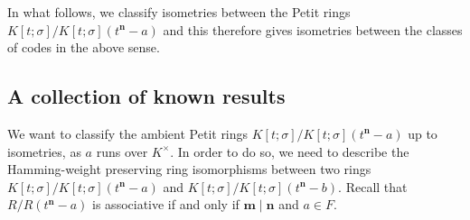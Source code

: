 \documentclass[11pt]{amsart}
\theoremstyle{plain}
\theoremstyle{definition}
\newtheorem{definition}[theorem]{Definition}
\numberwithin{equation}{section}
\numberwithin{figure}{section}
\newcommand{\Kone}[1]{K[t;\sigma]/K[t;\sigma](t^{\de}-#1)}
\newcommand{\os}{{\mathbf{m}}}  %
\newcommand{\de}{{\mathbf{n}}}  %
\newcommand{\ignore}[1]{}
\begin{document}
In what follows, we classify isometries between the Petit rings $\Kone{a}$ and this therefore gives isometries between the classes of codes in the above sense.


\ignore{%
\textcolor{red}{To be discussed: where do the following bits belong and do we need the equivalence on the elements?  There's a lot of repetition and we're using many equivalent phrases (monomial, $1$-equiv etc).  Do we use $a\cong_{Chen}b$ that way later?}

\color{purple}

Inspired by \cite{OuazzouNajmeddineAydin2025, OuazzouHorlemannAydin2025} we look at equivalence relations on  $K^\times$ using the following equivalence relations:

\begin{definition} \label{def:equ}

We call $a$ \emph{isometric} to $b$, written $a\cong_\de b,$
if there exists an isometry $G_{\tau,\alpha,k}:K[t;\sigma]/K[t;\sigma](t^\de-a)\rightarrow K[t;\sigma]/K[t;\sigma](t^\de-b),$
and \emph{Chen isometric}, if $\tau=id$.
\\
We call $a$ \emph{equivalent} to $b$, written
$a\sim_\de b,$
if there exists an equivalence $G_{\tau,\alpha}:K[t;\sigma]/K[t;\sigma](t^\de-a)\rightarrow K[t;\sigma]/K[t;\sigma](t^\de-b)$,
and \emph{Chen equivalent}, written
$a\sim_{Chen, \de} b$
if $\tau=id$.
\end{definition}

The above equivalence relations  partition $(K^\times)^\de$ into different equivalence classes.
Moreover,
$a\cong_\de b$
if and only if ${\bf C}_a$  and ${\bf C}_b$ are isometric,
$a\cong_{Chen, \de} b$
if and only if ${\bf C}_a$  and ${\bf C}_b$ are Chen isometric,
$a\sim_\de b$
if and only if ${\bf C}_a$  and ${\bf C}_b$ are equivalent, and
$a\sim_{Chen, \de} b$
if and only if ${\bf C}_a$  and ${\bf C}_b$ are Chen equivalent.

\color{black}
}%


 \subsection{A collection of known results}\label{subsec:results}

  We want to classify the ambient Petit rings $K[t;\sigma]/K[t;\sigma](t^\de-a)$
 up to isometries,  as $a$ runs over $K^\times$. In order to do so,
  we  need to describe  the Hamming-weight preserving ring isomorphisms between two  rings $K[t;\sigma]/K[t;\sigma](t^\de-a)$ and $K[t;\sigma]/K[t;\sigma](t^\de-b)$. Recall that
$R/R(t^\de-a)$ is associative if and only if $\os\mid \de$ and $a\in F$.
\end{document}
